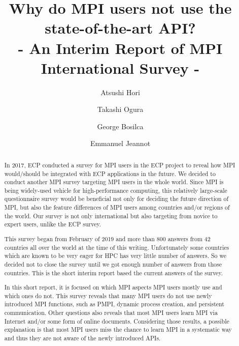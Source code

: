 \documentclass[sigconf,nonacm]{acmart}
\begin{document}
\title{Why do MPI users not use the state-of-the-art API?\\
- An Interim Report of MPI International Survey -}


\author{Atsushi Hori}
\author{Takashi Ogura}
 
\author{George Bosilca}
 
\author{Emmanuel Jeannot}

\begin{abstract}
In 2017, ECP\cite{ECP} conducted a survey for MPI users in the ECP
project to reveal how MPI would/should be integrated with ECP
applications in the future\cite{osti_1462877}.  
We decided to conduct another MPI survey targeting MPI users in the
whole world. Since MPI is being widely-used vehicle for
high-performance computing, this relatively large-scale questionnaire 
survey would be beneficial not only for deciding the future direction
of MPI, but also the feature differences of MPI users among
countries and/or regions of the world.  Our survey is not only
international but also targeting from novice to expert users, unlike
the ECP survey.

This survey began from February of 2019 and more than 800 answers from
42 countries all over the world at the time of this writing.
Unfortunately some countries which are known to be very eager for HPC
has very little number of answers. So we decided not to close the
survey until we got enough number of answers from those
countries. This is the short interim report based the current answers
of the survey. 

In this short report, it is focused on which MPI aspects MPI users
mostly use and which ones do not. This survey reveals that many MPI
users do not use newly introduced MPI functions, such as PMPI, dynamic
process creation, and persistent communication. Other questions also
reveals that most MPI users learn MPI via Internet and/or some form of
online documents. Considering those results, a possible explanation is
that most MPI users miss the chance to learn MPI in a systematic way
and thus they are not aware of the newly introduced APIs.
\end{abstract}

\maketitle
\end{document}
